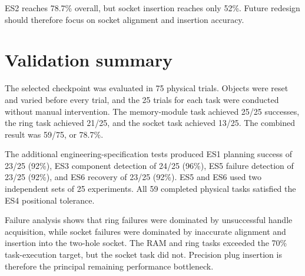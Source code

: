 ES2 reaches 78.7\% overall, but socket insertion reaches only 52\%. Future
redesign should therefore focus on socket alignment and insertion accuracy.

\section{Validation summary}

The selected checkpoint was evaluated in 75 physical trials. Objects were reset and varied before every trial, and the 25 trials for each task were conducted without manual intervention. The memory-module task achieved 25/25 successes, the ring task achieved 21/25, and the socket task achieved 13/25. The combined result was 59/75, or 78.7\%.

The additional engineering-specification tests produced ES1 planning success of 23/25 (92\%), ES3 component detection of 24/25 (96\%), ES5 failure detection of 23/25 (92\%), and ES6 recovery of 23/25 (92\%). ES5 and ES6 used two independent sets of 25 experiments. All 59 completed physical tasks satisfied the ES4 positional tolerance.

Failure analysis shows that ring failures were dominated by unsuccessful handle acquisition, while socket failures were dominated by inaccurate alignment and insertion into the two-hole socket. The RAM and ring tasks exceeded the 70\% task-execution target, but the socket task did not. Precision plug insertion is therefore the principal remaining performance bottleneck.

\setlength{\emergencystretch}{0pt}
